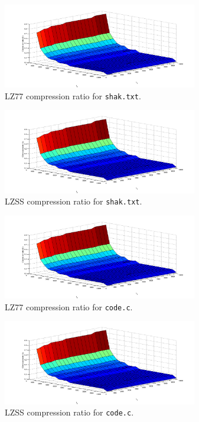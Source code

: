 \begin{center}
\begin{figure}[H]
\includegraphics[width=8.5cm]{images/rep_surf.png}
\caption{LZ77 compression ratio for \texttt{shak.txt}.}
\end{figure}
\end{center}

\begin{center}
\begin{figure}[H]
\includegraphics[width=8.5cm]{images/rep_surf.png}
\caption{LZSS compression ratio for \texttt{shak.txt}.}
\end{figure}
\end{center}

\begin{center}
\begin{figure}[H]
\includegraphics[width=8.5cm]{images/rep_surf.png}
\caption{LZ77 compression ratio for \texttt{code.c}.}
\end{figure}
\end{center}

\begin{center}
\begin{figure}[H]
\includegraphics[width=8.5cm]{images/rep_surf.png}
\caption{LZSS compression ratio for \texttt{code.c}.}
\end{figure}
\end{center}

